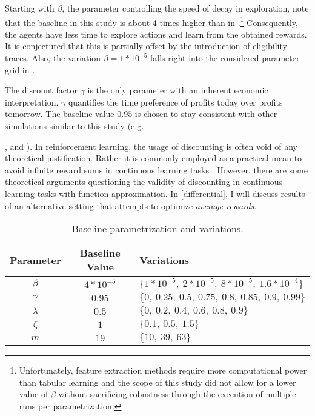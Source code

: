 Starting with $\beta$, the parameter controlling the speed of decay in exploration, note that the baseline in this study is about 4 times higher than in \textcite[p.3275-3276]{calvano_artificial_2020}.\footnote{Unfortunately, feature extraction methods require more computational power than tabular learning and the scope of this study did not allow for a lower value of $\beta$ without sacrificing robustness through the execution of multiple runs per parametrization.} Consequently, the agents have less time to explore actions and learn from the obtained rewards. It is conjectured that this is partially offset by the introduction of eligibility traces. Also, the variation $\beta = 1*10^{-5}$ falls right into the considered parameter grid in \textcite{calvano_artificial_2020}.

The discount factor $\gamma$ is the only parameter with an inherent economic interpretation. $\gamma$ quantifies the time preference of profits today over profits tomorrow. The baseline value $0.95$ is chosen to stay consistent with other simulations similar to this study (e.g.\ {\textcite{calvano_artificial_2020}, \textcite{klein_autonomous_2019} and \textcite{hettich_algorithmic_2021}). In reinforcement learning, the usage of discounting is often void of any theoretical justification. Rather it is commonly employed as a practical mean to avoid infinite reward sums in continuous learning tasks \parencite[p.3]{schwartz_reinforcement_1993}. However, there are some theoretical arguments questioning the validity of discounting in continuous learning tasks with function approximation. In \autoref{differential}, I will discuss results of an alternative setting that attempts to optimize \emph{average rewards}.

	\begin{table}
		\centering
		\begin{tabular}{|c|c|l|}
			\hline
			\textbf{Parameter}&\textbf{Baseline Value}&\textbf{Variations}\\
			\hline
			$\beta$&$4 * 10^{-5}$&$\{1 * 10^{-5}, ~2 * 10^{-5}, ~8 * 10^{-5}, ~1.6 * 10^{-4}\}$ \\
			\hline
			$\gamma$&$0.95$&$\{0, ~0.25, ~0.5, ~0.75, ~0.8, ~0.85, ~0.9, ~0.99\}$ \\
			\hline
			$\lambda$&$0.5$&$\{0, ~0.2, ~0.4, ~0.6, ~0.8, ~0.9\}$ \\
			\hline
			$\zeta$&$1$&$\{0.1, ~0.5, ~1.5\}$ \\
			\hline
			$m$&$19$&$\{10, ~39, ~63\}$ \\
			\hline
		\end{tabular}
		\caption[Baseline parametrization and variations]{Baseline parametrization and variations.}
		\label{baseline}
	\end{table}

}
